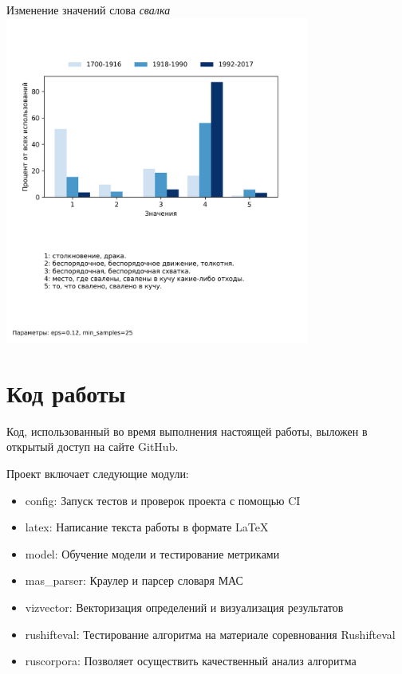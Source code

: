 \documentclass[LI,VKR]{HSEUniversity}
\begin{document}
\begin{FIGURE}[H]{Изменение значений слова \textit{свалка} \label{fig:example-figure-2}}
	\includegraphics[width=0.75\textwidth]{img/visualizations/svalka}
\end{FIGURE}

%

\section{Код работы}

Код, использованный во время выполнения настоящей работы, выложен в открытый доступ
на сайте GitHub.~

Проект включает следующие модули:
\begin{itemize}
    \item config: Запуск тестов и проверок проекта с помощью CI
    \item latex: Написание текста работы в формате LaTeX
    \item model: Обучение модели и тестирование метриками
    \item mas\_parser: Краулер и парсер словаря МАС
    \item vizvector: Векторизация определений и визуализация результатов
    \item rushifteval: Тестирование алгоритма на материале соревнования Rushifteval
    \item ruscorpora: Позволяет осуществить качественный анализ алгоритма
\end{itemize}
\end{document}
